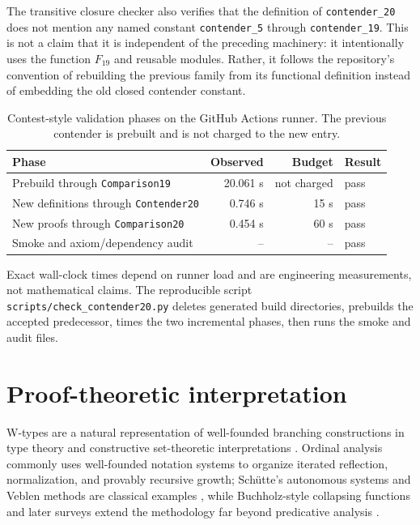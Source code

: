 \documentclass[11pt]{article}
\theoremstyle{definition}
\theoremstyle{remark}
\newcommand{\DefinitionTime}{0.746 s}
\newcommand{\ProofTime}{0.454 s}
\newcommand{\PreviousTime}{20.061 s}
\begin{document}
The transitive closure checker also verifies that the definition of
\texttt{contender\_20} does not mention any named constant
\texttt{contender\_5} through \texttt{contender\_19}.  This is not a claim that
it is independent of the preceding machinery: it intentionally uses the
function $F_{19}$ and reusable modules.  Rather, it follows the repository's
convention of rebuilding the previous family from its functional definition
instead of embedding the old closed contender constant.

\begin{table}[ht]
\centering
\caption{Contest-style validation phases on the GitHub Actions runner.  The
previous contender is prebuilt and is not charged to the new entry.}
\label{tab:timing}
\begin{tabular}{@{}lrrl@{}}
\toprule
Phase & Observed & Budget & Result \\
\midrule
Prebuild through \texttt{Comparison19} & \PreviousTime{} & not charged & pass \\
New definitions through \texttt{Contender20} & \DefinitionTime{} & 15 s & pass \\
New proofs through \texttt{Comparison20} & \ProofTime{} & 60 s & pass \\
Smoke and axiom/dependency audit & -- & -- & pass \\
\bottomrule
\end{tabular}
\end{table}

Exact wall-clock times depend on runner load and are engineering measurements,
not mathematical claims.  The reproducible script
\texttt{scripts/check\_contender20.py} deletes generated build directories,
prebuilds the accepted predecessor, times the two incremental phases, then
runs the smoke and audit files.

\section{Proof-theoretic interpretation}
\label{sec:interpretation}

W-types are a natural representation of well-founded branching constructions
in type theory and constructive set-theoretic interpretations
\cite{Aczel1978,Aczel1986}.  Ordinal analysis commonly uses well-founded
notation systems to organize iterated reflection, normalization, and
provably recursive growth; Sch\"utte's autonomous systems and Veblen methods
are classical examples \cite{Schuette1977}, while Buchholz-style collapsing
functions and later surveys extend the methodology far beyond predicative
analysis \cite{Buchholz1986,Rathjen2007,Rathjen1999}.
\end{document}
